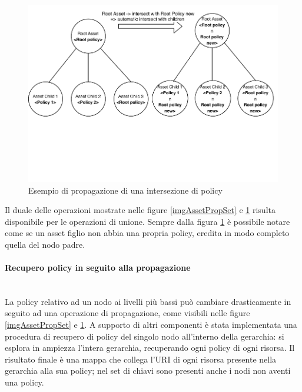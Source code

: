 \documentclass[12pt,a4paper,twoside]{book}
\begin{document}
\begin{figure}[H]
\centering
\includegraphics[scale=.70]{../immagini/assetIntersectPropagation.pdf}
\caption{Esempio di propagazione di una intersezione di policy}
\label{imgAssetPropIntersect}
\end{figure}
Il duale delle operazioni mostrate nelle figure \ref{imgAssetPropSet} e \ref{imgAssetPropIntersect} risulta disponibile per le operazioni di unione. Sempre dalla figura \ref{imgAssetPropIntersect} è possibile notare come se un asset figlio non abbia una propria policy, eredita in modo completo quella del nodo padre.
\paragraph{Recupero policy in seguito alla propagazione}\label{recuperoPolicy}\mbox{}\\
La policy relativo ad un nodo ai livelli più bassi può cambiare drasticamente in seguito ad una operazione di propagazione, come visibili nelle figure \ref{imgAssetPropSet} e \ref{imgAssetPropIntersect}. A supporto di altri componenti è stata implementata una procedura di recupero di policy del singolo nodo all'interno della gerarchia: si esplora in ampiezza l'intera gerarchia, recuperando ogni policy di ogni risorsa. Il risultato finale è una mappa che collega l'URI di ogni risorsa presente nella gerarchia alla sua policy; nel set di chiavi sono presenti anche i nodi non aventi una policy.
\end{document}
